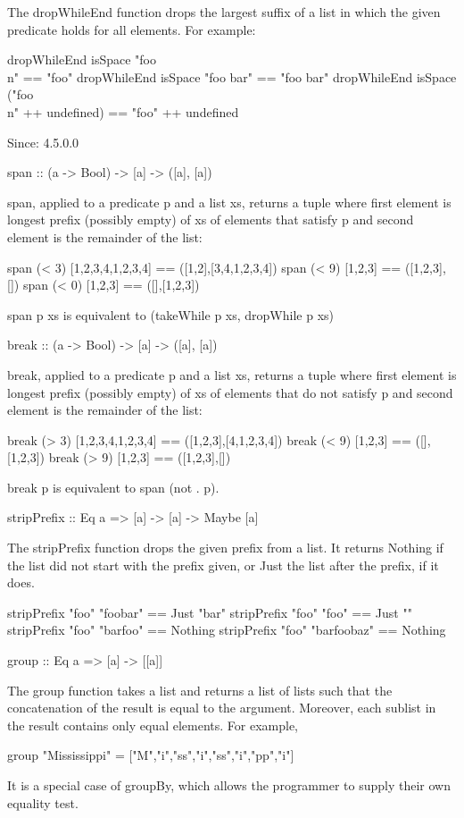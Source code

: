 The dropWhileEnd function drops the largest suffix of a list in which the given predicate holds for all elements. For example:

dropWhileEnd isSpace "foo\\n" == "foo"
dropWhileEnd isSpace "foo bar" == "foo bar"
dropWhileEnd isSpace ("foo\\n" ++ undefined) == "foo" ++ undefined

Since: 4.5.0.0

span :: (a -> Bool) -> [a] -> ([a], [a])

span, applied to a predicate p and a list xs, returns a tuple where first element is longest prefix (possibly empty) of xs of elements that satisfy p and second element is the remainder of the list:

span (< 3) [1,2,3,4,1,2,3,4] == ([1,2],[3,4,1,2,3,4])
span (< 9) [1,2,3] == ([1,2,3],[])
span (< 0) [1,2,3] == ([],[1,2,3])

span p xs is equivalent to (takeWhile p xs, dropWhile p xs)

break :: (a -> Bool) -> [a] -> ([a], [a])

break, applied to a predicate p and a list xs, returns a tuple where first element is longest prefix (possibly empty) of xs of elements that do not satisfy p and second element is the remainder of the list:

break (> 3) [1,2,3,4,1,2,3,4] == ([1,2,3],[4,1,2,3,4])
break (< 9) [1,2,3] == ([],[1,2,3])
break (> 9) [1,2,3] == ([1,2,3],[])

break p is equivalent to span (not . p).

stripPrefix :: Eq a => [a] -> [a] -> Maybe [a]

The stripPrefix function drops the given prefix from a list. It returns Nothing if the list did not start with the prefix given, or Just the list after the prefix, if it does.

stripPrefix "foo" "foobar" == Just "bar"
stripPrefix "foo" "foo" == Just ""
stripPrefix "foo" "barfoo" == Nothing
stripPrefix "foo" "barfoobaz" == Nothing

group :: Eq a => [a] -> [[a]]

The group function takes a list and returns a list of lists such that the concatenation of the result is equal to the argument. Moreover, each sublist in the result contains only equal elements. For example,

group "Mississippi" = ["M","i","ss","i","ss","i","pp","i"]

It is a special case of groupBy, which allows the programmer to supply their own equality test.

